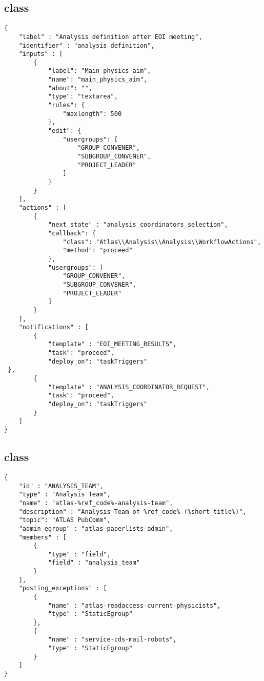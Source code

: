 \subsection{ class}%
\label{app:analysis:workflow}

\begin{lstlisting}
{
    "label" : "Analysis definition after EOI meeting",
    "identifier" : "analysis_definition",
    "inputs" : [
        {
            "label": "Main physics aim",
            "name": "main_physics_aim",
            "about": "",
            "type": "textarea",
            "rules": {
                "maxlength": 500
            },
            "edit": {
                "usergroups": [
                    "GROUP_CONVENER",
                    "SUBGROUP_CONVENER",
                    "PROJECT_LEADER"
                ]
            }
        }
    ],
    "actions" : [
        {
            "next_state" : "analysis_coordinators_selection",
            "callback": {
                "class": "Atlas\\Analysis\\Analysis\\WorkflowActions",
                "method": "proceed"
            },
            "usergroups": [
                "GROUP_CONVENER",
                "SUBGROUP_CONVENER",
                "PROJECT_LEADER"
            ]
        }
    ],
    "notifications" : [
        {
            "template" : "EOI_MEETING_RESULTS",
            "task": "proceed",
            "deploy_on": "taskTriggers"
 },
        {
            "template" : "ANALYSIS_COORDINATOR_REQUEST",
            "task": "proceed",
            "deploy_on": "taskTriggers"
        }
    ]
}
\end{lstlisting}

\subsection{ class}%
\label{app:analysis:egroupmanager}

\begin{lstlisting}
{
    "id" : "ANALYSIS_TEAM",
    "type" : "Analysis Team",
    "name" : "atlas-%ref_code%-analysis-team",
    "description" : "Analysis Team of %ref_code% (%short_title%)",
    "topic": "ATLAS PubComm",
    "admin_egroup" : "atlas-paperlists-admin",
    "members" : [
        {
            "type" : "field",
            "field" : "analysis_team"
        }
    ],
    "posting_exceptions" : [
        {
            "name" : "atlas-readaccess-current-physicists",
            "type" : "StaticEgroup"
        },
        {
            "name" : "service-cds-mail-robots",
            "type" : "StaticEgroup"
        }
    ]
}
\end{lstlisting}


